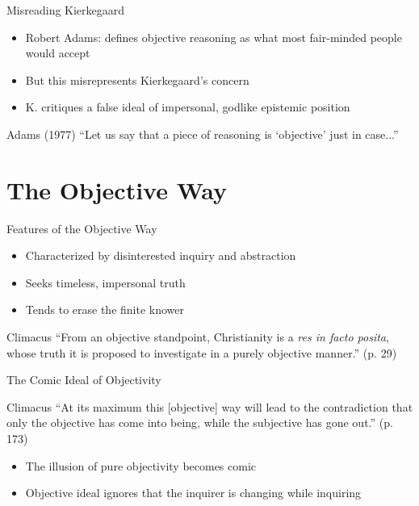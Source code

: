 \documentclass[12pt]{beamer}
\begin{document}
\begin{frame}{Misreading Kierkegaard}
\begin{itemize}
  \item Robert Adams: defines objective reasoning as what most fair-minded people would accept
  \item But this misrepresents Kierkegaard’s concern
  \item K. critiques a false ideal of impersonal, godlike epistemic position
\end{itemize}
\begin{block}{Adams (1977)}
“Let us say that a piece of reasoning is ‘objective’ just in case...”
\end{block}
\end{frame}

\section{The Objective Way}

\begin{frame}{Features of the Objective Way}
\begin{itemize}
  \item Characterized by disinterested inquiry and abstraction
  \item Seeks timeless, impersonal truth
  \item Tends to erase the finite knower
\end{itemize}
\begin{block}{Climacus}
“From an objective standpoint, Christianity is a \emph{res in facto posita}, whose truth it is proposed to investigate in a purely objective manner.” (p. 29)
\end{block}
\end{frame}

\begin{frame}{The Comic Ideal of Objectivity}
\begin{block}{Climacus}
“At its maximum this [objective] way will lead to the contradiction that only the objective has come into being, while the subjective has gone out.” (p. 173)
\end{block}
\begin{itemize}
  \item The illusion of pure objectivity becomes comic
  \item Objective ideal ignores that the inquirer is changing while inquiring
\end{itemize}
\end{frame}
\end{document}
